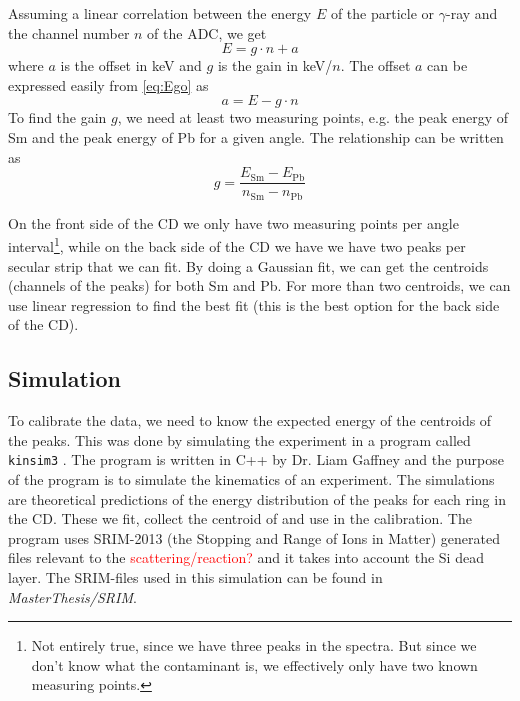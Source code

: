 \documentclass[twoside,english]{uiofysmaster/uiofysmaster}
\newcommand{\ga}{$\gamma$}
\begin{document}
Assuming a linear correlation between the energy $E$ of the particle or \ga-ray and the channel number $n$ of the ADC, we get
\begin{equation}\label{eq:Ego}
	E = g \cdot n + a
\end{equation}
where $a$ is the offset in keV and $g$ is the gain in keV/$n$. 
The offset $a$ can be expressed easily from \autoref{eq:Ego} as 
\begin{equation}\label{eq:offset}
	a = E - g \cdot n 
\end{equation}
To find the gain $g$, we need at least two measuring points, e.g. the peak energy of Sm and the peak energy of Pb for a given angle. 
The relationship can be written as 
\begin{equation}\label{eq:gain}
	g = \frac{E_{\text{Sm}} - E_{\text{Pb}}}{n_{\text{Sm}} - n_{\text{Pb}}}
\end{equation}

On the front side of the CD we only have two measuring points per angle interval\footnote{Not entirely true, since we have three peaks in the spectra. But since we don't know what the contaminant is, we effectively only have two known measuring points.}, while on the back side of the CD we have we have two peaks per secular strip that we can fit. 
By doing a Gaussian fit, we can get the centroids (channels of the peaks) for both Sm and Pb. 
For more than two centroids, we can use linear regression to find the best fit (this is the best option for the back side of the CD).



\subsection{Simulation}
To calibrate the data, we need to know the expected energy of the centroids of the peaks. 
This was done by simulating the experiment in a program called \texttt{kinsim3} \cite{kinsim}. 
The program is written in C++ by Dr. Liam Gaffney and the purpose of the program is to simulate the kinematics of an experiment. 
The simulations are theoretical predictions of the energy distribution of the peaks for each ring in the CD.
These we fit, collect the centroid of and use in the calibration.
The program uses SRIM-2013 \cite{SRIM} (the Stopping and Range of Ions in Matter) generated files relevant to the \textcolor{red}{scattering/reaction?} and it takes into account the Si dead layer. 
The SRIM-files used in this simulation can be found in \textit{MasterThesis/SRIM}.
\end{document}
